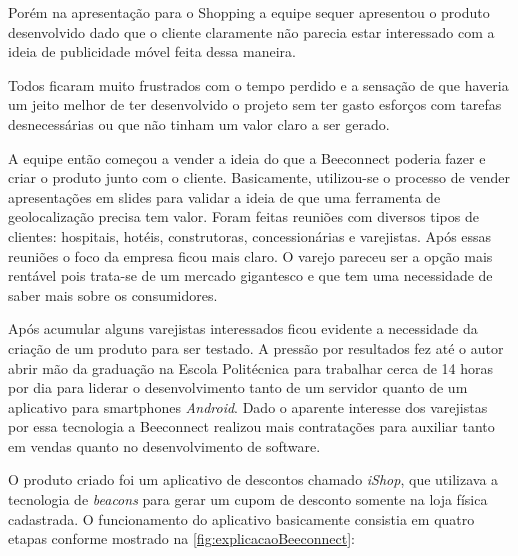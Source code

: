 Porém na apresentação para o Shopping a equipe sequer apresentou o produto desenvolvido dado que o cliente claramente não parecia estar interessado com a ideia de publicidade móvel feita dessa maneira.

Todos ficaram muito frustrados com o tempo perdido e a sensação de que haveria um jeito melhor de ter desenvolvido o projeto sem ter gasto esforços com tarefas desnecessárias ou que não tinham um valor claro a ser gerado.

A equipe então começou a vender a ideia do que a Beeconnect poderia fazer e criar o produto junto com o cliente. Basicamente, utilizou-se o processo de vender apresentações em slides para validar a ideia de que uma ferramenta de geolocalização precisa tem valor. Foram feitas reuniões com diversos tipos de clientes: hospitais, hotéis, construtoras, concessionárias e varejistas. Após essas reuniões o foco da empresa ficou mais claro. O varejo pareceu ser a opção mais rentável pois trata-se de um mercado gigantesco e que tem uma necessidade de saber mais sobre os consumidores.

Após acumular alguns varejistas interessados ficou evidente a necessidade da criação de um produto para ser testado. A pressão por resultados fez até o autor abrir mão da graduação na Escola Politécnica para trabalhar cerca de 14 horas por dia para liderar o desenvolvimento tanto de um servidor quanto de um aplicativo para smartphones \textit{Android}. Dado o aparente interesse dos varejistas por essa tecnologia a Beeconnect realizou mais contratações para auxiliar tanto em vendas quanto no desenvolvimento de software.

O produto criado foi um aplicativo de descontos chamado \textit{iShop}, que utilizava a tecnologia de \textit{beacons} para gerar um cupom de desconto somente na loja física cadastrada. O funcionamento do aplicativo basicamente consistia em quatro etapas conforme mostrado na \autoref{fig:explicacaoBeeconnect}:

